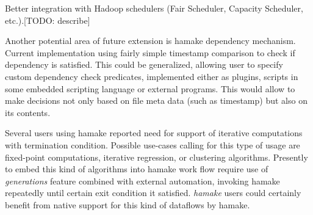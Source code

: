 \documentclass[10pt,conference,letterpaper]{IEEEtran}
\begin{document}
Better integration with Hadoop schedulers (Fair Scheduler, Capacity
Scheduler, etc.).[TODO: describe]

Another potential area of future extension is hamake dependency
mechanism. Current implementation using fairly simple timestamp
comparison to check if dependency is satisfied. This could be
generalized, allowing user to specify custom dependency check
predicates, implemented either as plugins, scripts in some embedded
scripting language or external programs. This would allow to make
decisions not only based on file meta data (such as timestamp) but
also on its contents.

Several users using hamake reported need for support of iterative
computations with termination condition. Possible use-cases calling
for this type of usage are fixed-point computations, iterative
regression, or clustering algorithms. Presently to embed this kind of
algorithms into hamake work flow require use of \textit{generations}
feature combined with external automation, invoking hamake repeatedly
until certain exit condition it satisfied. \textit{hamake} users could
certainly benefit from native support for this kind of dataflows by
hamake.

\nocite{*}


\end{document}

